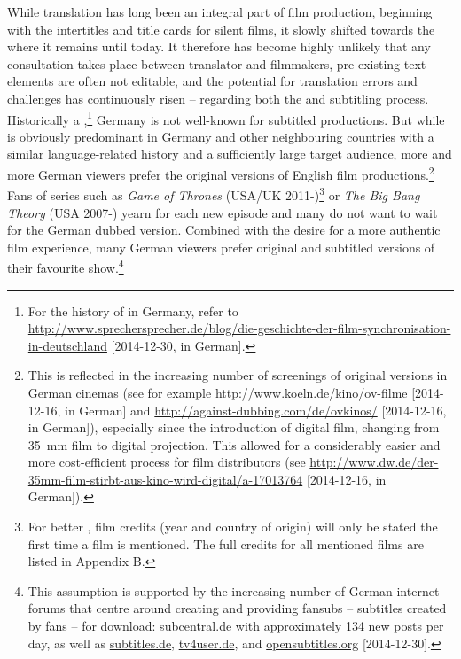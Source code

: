 
While translation has long been an integral part of film production, beginning with the intertitles and title cards for silent films, it slowly shifted towards the  where it remains until today. It therefore has become highly unlikely that any consultation takes place between translator and filmmakers, pre-existing text elements are often not editable, and the potential for translation errors and  challenges has continuously risen – regarding both the  and subtitling process. Historically a ,\footnote{For the history of  in Germany, refer to \url{http://www.sprechersprecher.de/blog/die-geschichte-der-film-synchronisation-in-deutschland} [2014-12-30, in German].} Germany is not well-known for subtitled productions. But while  is obviously predominant in Germany and other neighbouring countries with a similar language-related history and a sufficiently large target audience, more and more German viewers prefer the original versions of English film productions.\footnote{This is reflected in the increasing number of screenings of original versions in German cinemas (see for example \url{http://www.koeln.de/kino/ov-filme} [2014-12-16, in German] and \url{http://against-dubbing.com/de/ovkinos/} [2014-12-16, in German]), especially since the introduction of digital film, changing from 35~mm film to digital projection. This allowed for a considerably easier and more cost-efficient process for film distributors (see \url{http://www.dw.de/der-35mm-film-stirbt-aus-kino-wird-digital/a-17013764} [2014-12-16, in German]).} Fans of series such as \textit{Game of Thrones} (USA/UK 2011-)\footnote{For better , film credits (year and country of origin) will only be stated the first time a film is mentioned. The full credits for all mentioned films are listed in Appendix B.} or \textit{The Big Bang Theory} (USA 2007-) yearn for each new episode and many do not want to wait for the German dubbed version. Combined with the desire for a more authentic film experience, many German viewers prefer original and subtitled versions of their favourite show.\footnote{This assumption is supported by the increasing number of German internet forums that centre around creating and providing fansubs – subtitles created by fans – for download: \url{subcentral.de} with approximately 134 new posts per day, as well as \url{subtitles.de}, \url{tv4user.de}, and \url{opensubtitles.org} [2014-12-30].}


